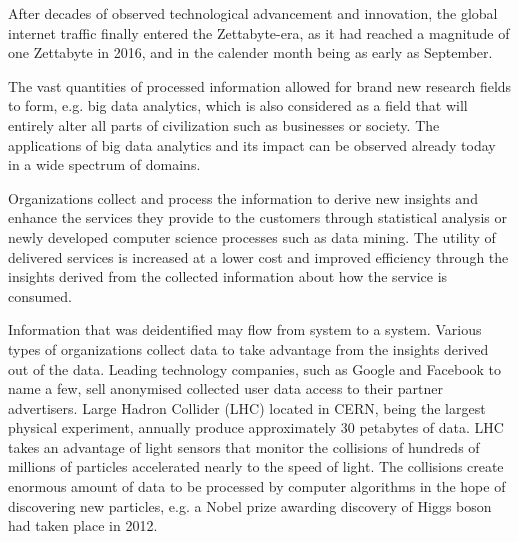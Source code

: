 \documentclass[a4paper,twoside,12pt]{book}
\begin{document}
After decades of observed technological advancement and innovation, the global internet traffic finally entered the Zettabyte-era, as it had reached a magnitude of one Zettabyte in 2016, and in the calender month being as early as September.\cite{bib:cisco_blog}

The vast quantities of processed information allowed for brand new research fields to form, e.g. big data analytics, which is also considered as a field that will entirely alter all parts of civilization such as businesses or society.\cite{bib:big_data_in_practice} The applications of big data analytics and its impact can be observed already today in a wide spectrum of domains.

Organizations collect and process the information to derive new insights and enhance the services they provide to the customers through statistical analysis or newly developed computer science processes such as data mining.
The utility of delivered services is increased at a lower cost and improved efficiency through the insights derived from the collected information about how the service is consumed.\cite{bib:anonymization_pipeline}


Information that was deidentified may flow from system to a system. Various types of organizations collect data to take advantage from the insights derived out of the data. Leading technology companies, such as Google and Facebook to name a few, sell anonymised collected user data access to their partner advertisers.\cite{bib:big_data_in_practice} Large Hadron Collider (LHC) located in CERN, being the largest physical experiment, annually produce approximately 30 petabytes of data. LHC takes an advantage of light sensors that monitor the collisions of hundreds of millions of particles accelerated nearly to the speed of light. The collisions create enormous amount of data to be processed by computer algorithms in the hope of discovering new particles, e.g. a Nobel prize awarding discovery of Higgs boson had taken place in 2012.\cite{bib:cern}
\end{document}
